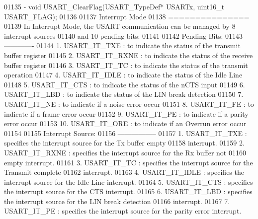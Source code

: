 \begin{DoxyCode}
01135 \textcolor{comment}{      - void USART\_ClearFlag(USART\_TypeDef* USARTx, uint16\_t USART\_FLAG);}
01136 \textcolor{comment}{}
01137 \textcolor{comment}{  Interrupt Mode}
01138 \textcolor{comment}{  ===============}
01139 \textcolor{comment}{  In Interrupt Mode, the USART communication can be managed by 8 interrupt sources}
01140 \textcolor{comment}{  and 10 pending bits: }
01141 \textcolor{comment}{}
01142 \textcolor{comment}{  Pending Bits:}
01143 \textcolor{comment}{  ------------- }
01144 \textcolor{comment}{     1. USART\_IT\_TXE : to indicate the status of the transmit buffer register}
01145 \textcolor{comment}{     2. USART\_IT\_RXNE : to indicate the status of the receive buffer register}
01146 \textcolor{comment}{     3. USART\_IT\_TC : to indicate the status of the transmit operation}
01147 \textcolor{comment}{     4. USART\_IT\_IDLE : to indicate the status of the Idle Line             }
01148 \textcolor{comment}{     5. USART\_IT\_CTS : to indicate the status of the nCTS input}
01149 \textcolor{comment}{     6. USART\_IT\_LBD : to indicate the status of the LIN break detection}
01150 \textcolor{comment}{     7. USART\_IT\_NE : to indicate if a noise error occur}
01151 \textcolor{comment}{     8. USART\_IT\_FE : to indicate if a frame error occur}
01152 \textcolor{comment}{     9. USART\_IT\_PE : to indicate if a parity error occur}
01153 \textcolor{comment}{     10. USART\_IT\_ORE : to indicate if an Overrun error occur}
01154 \textcolor{comment}{}
01155 \textcolor{comment}{  Interrupt Source:}
01156 \textcolor{comment}{  -----------------}
01157 \textcolor{comment}{     1. USART\_IT\_TXE : specifies the interrupt source for the Tx buffer empty }
01158 \textcolor{comment}{                       interrupt. }
01159 \textcolor{comment}{     2. USART\_IT\_RXNE : specifies the interrupt source for the Rx buffer not }
01160 \textcolor{comment}{                        empty interrupt.}
01161 \textcolor{comment}{     3. USART\_IT\_TC : specifies the interrupt source for the Transmit complete }
01162 \textcolor{comment}{                       interrupt. }
01163 \textcolor{comment}{     4. USART\_IT\_IDLE : specifies the interrupt source for the Idle Line interrupt.             }
01164 \textcolor{comment}{     5. USART\_IT\_CTS : specifies the interrupt source for the CTS interrupt. }
01165 \textcolor{comment}{     6. USART\_IT\_LBD : specifies the interrupt source for the LIN break detection}
01166 \textcolor{comment}{                       interrupt. }
01167 \textcolor{comment}{     7. USART\_IT\_PE : specifies the interrupt source for the parity error interrupt. }

\end{DoxyCode}
